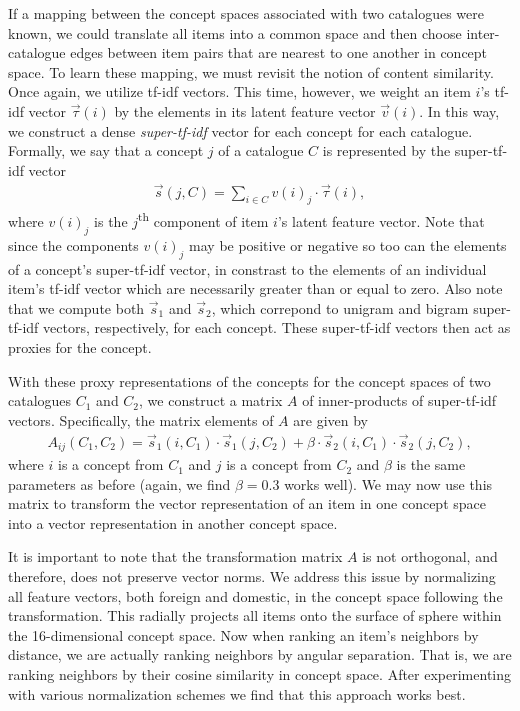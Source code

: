 \documentclass[11pt]{article}
\begin{document}
If a mapping between the concept spaces associated with two catalogues were
known, we could translate all items into a common space and then choose
inter-catalogue edges between item pairs that are nearest to one another in
concept space. To learn these mapping, we must revisit the notion of content
similarity. Once again, we utilize tf-idf vectors. This time, however, we weight
an item $i$'s tf-idf vector $\vec{\tau}(i)$ by the elements in its latent
feature vector $\vec{v}(i)$. In this way, we construct a dense {\em
super-tf-idf} vector for each concept for each catalogue. Formally, we say that
a concept $j$ of a catalogue $C$ is represented by the super-tf-idf vector
\begin{align}
\vec{s}(j,C) = \sum_{i \in C}{v(i)_j \cdot \vec{\tau}(i)},
\end{align}
where $v(i)_j$ is the $j$\textsuperscript{th} component of item $i$'s latent
feature vector. Note that since the components $v(i)_j$ may be positive or
negative so too can the elements of a concept's super-tf-idf vector, in
constrast to the elements of an individual item's tf-idf vector which are
necessarily greater than or equal to zero. Also note that we compute both
$\vec{s}_1$ and $\vec{s}_2$, which correpond to unigram and bigram super-tf-idf
vectors, respectively, for each concept. These super-tf-idf vectors then act as
proxies for the concept.

With these proxy representations of the concepts for the concept spaces of two
catalogues $C_1$ and $C_2$, we construct a matrix $A$ of inner-products of
super-tf-idf vectors.  Specifically, the matrix elements of $A$ are given by
\begin{align}
A_{ij}(C_1,C_2) = \vec{s}_1(i,C_1) \cdot \vec{s}_1(j,C_2) + \beta \cdot
\vec{s}_2(i,C_1) \cdot \vec{s}_2(j,C_2),
\end{align}
where $i$ is a concept from $C_1$ and $j$ is a concept from $C_2$ and $\beta$ is
the same parameters as before (again, we find $\beta=0.3$ works well).  We may
now use this matrix to transform the vector representation of an item in one
concept space into a vector representation in another concept space.

It is important to note that the transformation matrix $A$ is not orthogonal, and
therefore, does not preserve vector norms. We address this issue by normalizing
all feature vectors, both foreign and domestic, in the concept space following
the transformation. This radially projects all items onto the surface of sphere
within the 16-dimensional concept space. Now when ranking an item's neighbors by
distance, we are actually ranking neighbors by angular separation. That is, we
are ranking neighbors by their cosine similarity in concept space. After
experimenting with various normalization schemes we find that this approach
works best.
\end{document}
